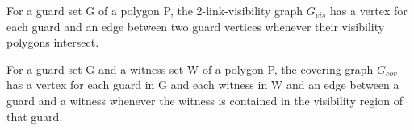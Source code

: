 \begin{definition}
For a guard set G of a polygon P, the 2-link-visibility graph $G_{vis}$ has a vertex for each guard and an edge between two guard vertices whenever their visibility polygons intersect.
\end{definition}

\begin{definition}
For a guard set G and a witness set W of a polygon P, the covering graph $G_{cov}$ has a vertex for each guard in G and each witness in W and an edge between a guard and a witness whenever the witness is contained in the visibility region of that guard.
\end{definition}

\begin{definition}

\end{definition}

\begin{definition}
    
\end{definition}